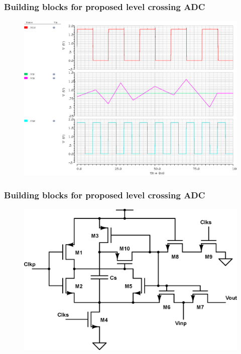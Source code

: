 \documentclass{beamer}
\begin{document}
\begin{frame}
	\frametitle{Building blocks for proposed level crossing ADC} \footnotesize
	\begin{center}
		\begin{figure}
			\includegraphics[width=10 cm, height=6 cm, angle=360]{Figures/SCMP.eps}\\
		\end{figure}
		\scriptsize{ \color{blue}{Simulation results of Clocked Comparator used in proposed ADC architecture}}
	\end{center}
\end{frame}
\begin{frame}
	\frametitle{Building blocks for proposed level crossing ADC} \footnotesize
	\begin{center}
		\begin{figure}
			\includegraphics[width=7 cm]{Figures/TAH.eps} \\
		\end{figure}
		\scriptsize{ \color{blue}{Track and Hold used in proposed ADC architecture}}
	\end{center}
\end{frame}
\end{document}
